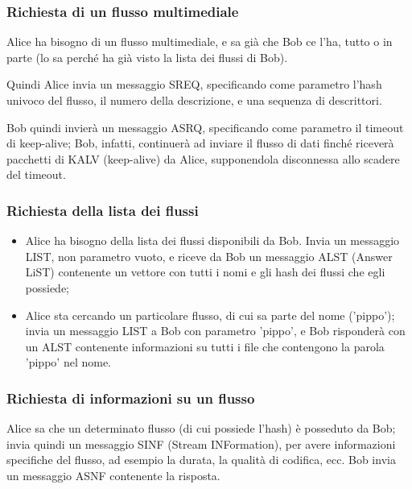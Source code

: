 \subsubsection{Richiesta di un flusso multimediale}
%

Alice ha bisogno di un flusso multimediale, e sa già che Bob ce l'ha, tutto o in
parte (lo sa perché ha già visto la lista dei flussi di Bob).

Quindi Alice invia un messaggio SREQ, specificando come parametro l'hash univoco
del flusso, il numero della descrizione, e una sequenza di descrittori.

Bob quindi invierà un messaggio ASRQ, specificando come parametro il timeout di
keep-alive; Bob, infatti, continuerà ad inviare il flusso di dati finché riceverà
pacchetti di KALV (keep-alive) da Alice, supponendola disconnessa allo scadere
del timeout.






\subsubsection{Richiesta della lista dei flussi}
%

\begin{itemize}
\item Alice ha bisogno della lista dei flussi disponibili da Bob. Invia un messaggio LIST, non parametro vuoto, e riceve da Bob un messaggio ALST (Answer LiST) contenente un vettore con tutti i nomi e gli hash dei flussi che egli possiede;
\item Alice sta cercando un particolare flusso, di cui sa parte del nome
('pippo'); invia un messaggio LIST a Bob con parametro 'pippo', e Bob
risponderà con un ALST contenente informazioni su tutti i file che contengono la
parola 'pippo' nel nome.
\end{itemize}




\subsubsection{Richiesta di informazioni su un flusso}
%

Alice sa che un determinato flusso (di cui possiede l'hash) è posseduto da Bob;
invia quindi un messaggio SINF (Stream INFormation), per avere informazioni
specifiche del flusso, ad esempio la durata, la qualità di codifica, ecc. Bob
invia un messaggio ASNF contenente la risposta.



